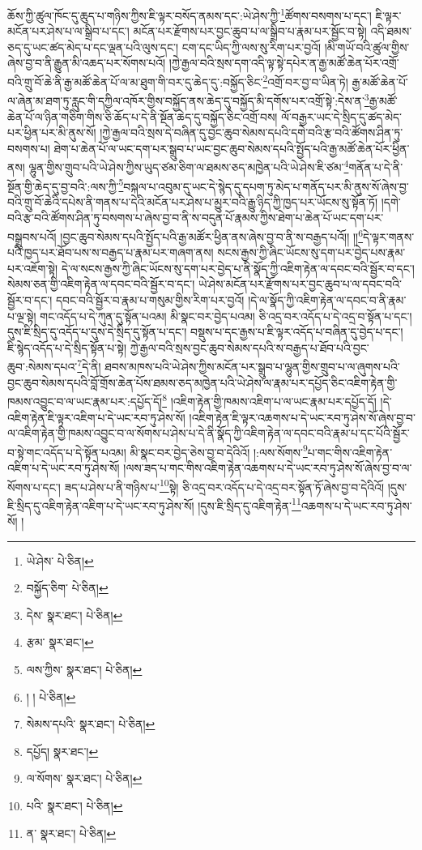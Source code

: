 ཆོས་ཀྱི་ཚུལ་ཁོང་དུ་ཆུད་པ་གཉིས་ཀྱིས་ཇི་ལྟར་བསོད་ནམས་དང་:ཡེ་ཤེས་ཀྱི་\footnote{ཡེ་ཤེས་  པེ་ཅིན། }ཚོགས་བསགས་པ་དང་། ཇི་ལྟར་མངོན་པར་ཤེས་པ་ལ་སྒྲིབ་པ་དང་། མངོན་པར་རྫོགས་པར་བྱང་ཆུབ་པ་ལ་སྒྲིབ་པ་རྣམ་པར་སྦྱོང་བ་སྟེ། འདི་ཐམས་ཅད་དུ་ཡང་ཚད་མེད་པ་དང་ལྡན་པའི་ལུས་དང་། ངག་དང་ཡིད་ཀྱི་ལས་སུ་རིག་པར་བྱའོ། །མི་གཡོ་བའི་ཚུལ་གྱིས་ཞེས་བྱ་བ་ནི་རྒྱུན་མི་འཆད་པར་སོགས་པའོ། །ཀྱེ་རྒྱལ་བའི་སྲས་དག་འདི་ལྟ་སྟེ་དཔེར་ན་རྒྱ་མཚོ་ཆེན་པོར་འགྲོ་བའི་གྲུ་བོ་ཆེ་ནི་རྒྱ་མཚོ་ཆེན་པོ་ལ་མ་ཐུག་གི་བར་དུ་ཆེད་དུ་:བསྐྱོད་ཅིང་\footnote{བསྐྱོད་ཅིག་  པེ་ཅིན། }འགྲོ་བར་བྱ་བ་ཡིན་ཏེ། རྒྱ་མཚོ་ཆེན་པོ་ལ་ཞེན་མ་ཐག་ཏུ་རླུང་གི་དཀྱིལ་འཁོར་གྱིས་བསྐྱོད་ནས་ཆེད་དུ་བསྐྱོད་མི་དགོས་པར་འགྲོ་སྟེ་:དེས་ན་\footnote{དེས་  སྣར་ཐང་།  པེ་ཅིན། }རྒྱ་མཚོ་ཆེན་པོ་ལ་ཉིན་གཅིག་གིས་ཅི་ཆོད་པ་དེ་ནི་སྔོན་ཆེད་དུ་བསྐྱོད་ཅིང་འགྲོ་བས། ལོ་བརྒྱར་ཡང་དེ་སྲིད་དུ་ཚད་མེད་པར་ཕྱིན་པར་མི་ནུས་སོ། །ཀྱེ་རྒྱལ་བའི་སྲས་དེ་བཞིན་དུ་བྱང་ཆུབ་སེམས་དཔའི་དགེ་བའི་རྩ་བའི་ཚོགས་ཤིན་ཏུ་བསགས་པ། ཐེག་པ་ཆེན་པོ་ལ་ཡང་དག་པར་སྒྲུབ་པ་ཡང་བྱང་ཆུབ་སེམས་དཔའི་སྤྱོད་པའི་རྒྱ་མཚོ་ཆེན་པོར་ཕྱིན་ནས། ལྷུན་གྱིས་གྲུབ་པའི་ཡེ་ཤེས་ཀྱིས་ཡུད་ཙམ་ཅིག་ལ་ཐམས་ཅད་མཁྱེན་པའི་ཡེ་ཤེས་ཇི་ཙམ་\footnote{རྩམ་  སྣར་ཐང་། }གནོན་པ་དེ་ནི་སྔོན་གྱི་ཆེད་དུ་བྱ་བའི་:ལས་ཀྱི་\footnote{ལས་ཀྱིས་  སྣར་ཐང་།  པེ་ཅིན། }བསྐལ་པ་འབུམ་དུ་ཡང་དེ་སྙེད་དུ་དཔག་ཏུ་མེད་པ་གནོད་པར་མི་ནུས་སོ་ཞེས་བྱ་བའི་གྲུ་བོ་ཆེའི་དཔེས་ནི་གནས་པ་དེའི་མངོན་པར་ཤེས་པ་མྱུར་བའི་རྒྱུ་ཉིད་ཀྱི་ཁྱད་པར་ཡོངས་སུ་སྟོན་ཏོ། །དགེ་བའི་རྩ་བའི་ཚོགས་ཤིན་ཏུ་བསགས་པ་ཞེས་བྱ་བ་ནི་ས་བདུན་པོ་རྣམས་ཀྱིས་ཐེག་པ་ཆེན་པོ་ཡང་དག་པར་བསྒྲུབས་པའོ། །བྱང་ཆུབ་སེམས་དཔའི་སྤྱོད་པའི་རྒྱ་མཚོར་ཕྱིན་ནས་ཞེས་བྱ་བ་ནི་ས་བརྒྱད་པའོ།། །།\footnote{། །  པེ་ཅིན། }དེ་ལྟར་གནས་པའི་ཁྱད་པར་ཐོབ་པས་ས་བརྒྱད་པ་རྣམ་པར་གཞག་ནས། སངས་རྒྱས་ཀྱི་ཞིང་ཡོངས་སུ་དག་པར་བྱེད་པས་རྣམ་པར་འཇོག་སྟེ། དེ་ལ་སངས་རྒྱས་ཀྱི་ཞིང་ཡོངས་སུ་དག་པར་བྱེད་པ་ནི་སྣོད་ཀྱི་འཇིག་རྟེན་ལ་དབང་བའི་སྦྱོར་བ་དང་། སེམས་ཅན་གྱི་འཇིག་རྟེན་ལ་དབང་བའི་སྦྱོར་བ་དང་། ཡེ་ཤེས་མངོན་པར་རྫོགས་པར་བྱང་ཆུབ་པ་ལ་དབང་བའི་སྦྱོར་བ་དང་། དབང་བའི་སྦྱོར་བ་རྣམ་པ་གསུམ་གྱིས་རིག་པར་བྱའོ། །དེ་ལ་སྣོད་ཀྱི་འཇིག་རྟེན་ལ་དབང་བ་ནི་རྣམ་པ་ལྔ་སྟེ། གང་འདོད་པ་དེ་ཀུན་དུ་སྟོན་པའམ། མི་སྣང་བར་བྱེད་པའམ། ཅི་འདྲ་བར་འདོད་པ་དེ་འདྲ་བ་སྟོན་པ་དང་། དུས་ཇི་སྲིད་དུ་འདོད་པ་དུས་དེ་སྲིད་དུ་སྟོན་པ་དང་། བསྡུས་པ་དང་རྒྱས་པ་ཇི་ལྟར་འདོད་པ་བཞིན་དུ་བྱེད་པ་དང་། ཇི་སྙེད་འདོད་པ་དེ་སྲིད་སྟོན་པ་སྟེ། ཀྱེ་རྒྱལ་བའི་སྲས་བྱང་ཆུབ་སེམས་དཔའི་ས་བརྒྱད་པ་ཐོབ་པའི་བྱང་ཆུབ་:སེམས་དཔའ་\footnote{སེམས་དཔའི་  སྣར་ཐང་།  པེ་ཅིན། }དེ་ནི། ཐབས་མཁས་པའི་ཡེ་ཤེས་ཀྱིས་མངོན་པར་སྒྲུབ་པ་ལྷུན་གྱིས་གྲུབ་པ་ལ་ཞུགས་པའི་བྱང་ཆུབ་སེམས་དཔའི་བློ་གྲོས་ཆེན་པོས་ཐམས་ཅད་མཁྱེན་པའི་ཡེ་ཤེས་ལ་རྣམ་པར་དཔྱོད་ཅིང་འཇིག་རྟེན་གྱི་ཁམས་འབྱུང་བ་ལ་ཡང་རྣམ་པར་:དཔྱོད་དོ།\footnote{དཔྱོད།  སྣར་ཐང་། } །འཇིག་རྟེན་གྱི་ཁམས་འཇིག་པ་ལ་ཡང་རྣམ་པར་དཔྱོད་དོ། །དེ་འཇིག་རྟེན་ཇི་ལྟར་འཇིག་པ་དེ་ཡང་རབ་ཏུ་ཤེས་སོ། །འཇིག་རྟེན་ཇི་ལྟར་འཆགས་པ་དེ་ཡང་རབ་ཏུ་ཤེས་སོ་ཞེས་བྱ་བ་ལ་འཇིག་རྟེན་གྱི་ཁམས་འབྱུང་བ་ལ་སོགས་པ་ཤེས་པ་དེ་ནི་སྣོད་ཀྱི་འཇིག་རྟེན་ལ་དབང་བའི་རྣམ་པ་དང་པོའི་སྦྱོར་བ་སྟེ་གང་འདོད་པ་དེ་སྟོན་པའམ། མི་སྣང་བར་བྱེད་ཅེས་བྱ་བ་དེའིའོ། །:ལས་སོགས་\footnote{ལ་སོགས་  སྣར་ཐང་།  པེ་ཅིན། }པ་གང་གིས་འཇིག་རྟེན་འཇིག་པ་དེ་ཡང་རབ་ཏུ་ཤེས་སོ། །ལས་ཟད་པ་གང་གིས་འཇིག་རྟེན་འཆགས་པ་དེ་ཡང་རབ་ཏུ་ཤེས་སོ་ཞེས་བྱ་བ་ལ་སོགས་པ་དང་། ཟད་པ་ཤེས་པ་ནི་གཉིས་པ་\footnote{པའི་  སྣར་ཐང་།  པེ་ཅིན། }སྟེ། ཅི་འདྲ་བར་འདོད་པ་དེ་འདྲ་བར་སྟོན་ཏོ་ཞེས་བྱ་བ་དེའིའོ། །དུས་ཇི་སྲིད་དུ་འཇིག་རྟེན་འཇིག་པ་དེ་ཡང་རབ་ཏུ་ཤེས་སོ། །དུས་ཇི་སྲིད་དུ་འཇིག་རྟེན་\footnote{ན་  སྣར་ཐང་།  པེ་ཅིན། }འཆགས་པ་དེ་ཡང་རབ་ཏུ་ཤེས་སོ། །
